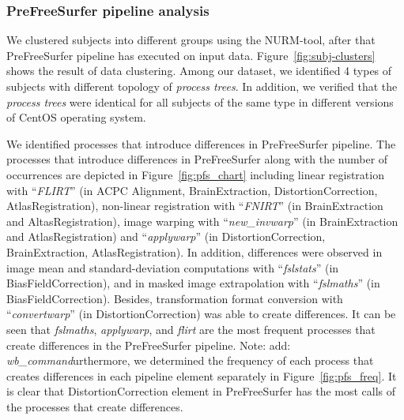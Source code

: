 \documentclass[a4paper,num-refs]{oup-contemporary}
\newcommand{\note}[2]{\color{blue}Note: #1\color{black}}
\begin{document}
\subsubsection{PreFreeSurfer pipeline analysis} 

We clustered subjects into different groups using the NURM-tool, 
after that PreFreeSurfer pipeline has executed on input data.
Figure~\ref{fig:subj-clusters} shows the result of data clustering. 
Among our dataset, we identified 4 types of subjects with 
different topology of \emph{process trees}. In addition, we verified that 
the \emph{process trees} were identical for all subjects of the same type in 
different versions of CentOS operating system. 

We identified processes that introduce differences in PreFreeSurfer 
pipeline. 
The processes that introduce differences in PreFreeSurfer along with the 
number of occurrences are depicted in Figure~\ref{fig:pfs_chart} 
including linear registration with “\emph{FLIRT}” (in 
ACPC Alignment, BrainExtraction, DistortionCorrection, 
AtlasRegistration), non-linear registration with “\emph{FNIRT}” (in 
BrainExtraction and AltasRegistration), image warping with 
“\emph{new\_invwarp}” (in BrainExtraction and AtlasRegistration) and 
“\emph{applywarp}” (in DistortionCorrection, BrainExtraction, AtlasRegistration).  
In addition, differences were observed in image mean and standard-deviation 
computations with “\emph{fslstats}” (in BiasFieldCorrection), and in 
masked image extrapolation with “\emph{fslmaths}” (in BiasFieldCorrection). 
Besides, transformation format conversion with 
“\emph{convertwarp}” (in DistortionCorrection) was able to create differences.
It can be seen that \emph{fslmaths}, \emph{applywarp}, and \emph{flirt} 
are the most frequent processes that create differences in the 
PreFreeSurfer pipeline.
\note{add: \emph{wb\_command}}


Furthermore, we determined the frequency of each process that creates differences in 
each pipeline element separately in Figure~\ref{fig:pfs_freq}. It is clear that 
DistortionCorrection element in PreFreeSurfer has the most calls of the processes that 
create differences.

\end{document}
